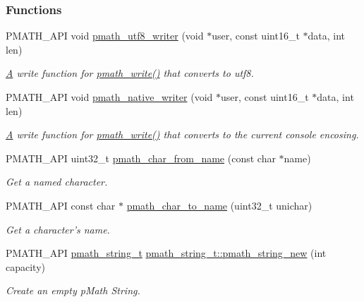 \subsubsection*{Functions}
\begin{CompactItemize}
\item 
PMATH\_\-API void \hyperlink{group__strings_g5e7a9b1a5eb8861e94dc1bea92c77424}{pmath\_\-utf8\_\-writer} (void $\ast$user, const uint16\_\-t $\ast$data, int len)
\begin{CompactList}\small\item\em \hyperlink{class_a}{A} {\em write\/} function for \hyperlink{group__objects_g9f909b9eb04317260ee8630d10e5a7c6}{pmath\_\-write()} that converts to utf8. \item\end{CompactList}\item 
PMATH\_\-API void \hyperlink{group__strings_ga3ecac6a71274a3e43cedadb10085f2b}{pmath\_\-native\_\-writer} (void $\ast$user, const uint16\_\-t $\ast$data, int len)
\begin{CompactList}\small\item\em \hyperlink{class_a}{A} {\em write\/} function for \hyperlink{group__objects_g9f909b9eb04317260ee8630d10e5a7c6}{pmath\_\-write()} that converts to the current console encosing. \item\end{CompactList}\item 
PMATH\_\-API uint32\_\-t \hyperlink{group__strings_g963fd4f434edb806b3f2262726d849be}{pmath\_\-char\_\-from\_\-name} (const char $\ast$name)
\begin{CompactList}\small\item\em Get a named character. \item\end{CompactList}\item 
PMATH\_\-API const char $\ast$ \hyperlink{group__strings_g21de2fb0e4e344d00d728f1c2fc4a941}{pmath\_\-char\_\-to\_\-name} (uint32\_\-t unichar)
\begin{CompactList}\small\item\em Get a character's name. \item\end{CompactList}\item 
PMATH\_\-API \hyperlink{classpmath__string__t}{pmath\_\-string\_\-t} \hyperlink{group__strings_g9f860fe571fcb87515b82ddc704c93ef}{pmath\_\-string\_\-t::pmath\_\-string\_\-new} (int capacity)
\begin{CompactList}\small\item\em Create an empty pMath String. \item\end{CompactList}\item 

\end{CompactItemize}
